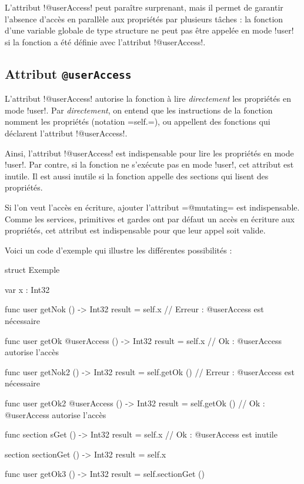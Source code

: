 L'attribut \omnibus!@userAccess! peut paraître surprenant, mais il permet de garantir l'absence d'accès en parallèle aux propriétés par plusieurs tâches : la fonction d'une variable globale de type structure ne peut pas être appelée en mode \omnibus!user! si la fonction a été définie avec l'attribut  \omnibus!@userAccess!.

\subsection{Attribut \texttt{@userAccess}}

L'attribut \omnibus!@userAccess! autorise la fonction à lire \emph{directement} les propriétés en mode \omnibus!user!. Par \emph{directement}, on entend que les instructions de la fonction nomment les propriétés (notation \omnibus=self.=), ou appellent des fonctions qui déclarent l'attribut \omnibus!@userAccess!.

Ainsi, l'attribut \omnibus!@userAccess! est indispensable pour lire les propriétés en mode \omnibus!user!. Par contre, si la fonction ne s'exécute pas en mode \omnibus!user!, cet attribut est inutile. Il est aussi inutile si la fonction appelle des sections qui lisent des propriétés.

Si l'on veut l'accès en écriture, ajouter l'attribut \omnibus=@mutating= est indispensable. Comme les services, primitives et gardes ont par défaut un accès en écriture aux propriétés, cet attribut est indispensable pour que leur appel soit valide.

Voici un code d'exemple qui illustre les différentes possibilités :
\begin{OMNIBUS}
struct Exemple {
  var x : Int32

  func user getNok () -> Int32 {
    result = self.x // Erreur : @userAccess est nécessaire
  }

  func user getOk @userAccess () -> Int32 {
    result = self.x // Ok : @userAccess autorise l'accès
  }

  func user getNok2  () -> Int32 {
    result = self.getOk () // Erreur : @userAccess est nécessaire
  }

  func user getOk2 @userAccess () -> Int32 {
    result = self.getOk () // Ok : @userAccess autorise l'accès
  }

  func section sGet () -> Int32 {
    result = self.x // Ok : @userAccess est inutile
  }

  section sectionGet () -> Int32 {
    result = self.x
  }

  func user getOk3 () -> Int32 {
    result = self.sectionGet ()
  }
}
\end{OMNIBUS}

